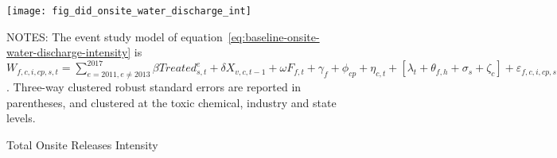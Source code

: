 \begin{figure}[H]
    \centering
    \texttt{[image: fig\_did\_onsite\_water\_discharge\_int]}
    \caption{Total Onsite Releases Intensity}
    \label{fig:baseline-onsite-water-discharge-intensity}
    \begin{minipage}{12cm}
        \vspace{0.05in}
        NOTES: The event study model of equation~\ref{eq:baseline-onsite-water-discharge-intensity} is $W_{f,c,i,cp,s,t} = \sum_{{e = 2011},{e \neq 2013}}^{2017} \beta Treated_{s,t}^e + \delta X_{v,c,t-1} + \omega F_{f,t} + \gamma_{f} + \phi_{cp} + \eta_{c,t} + \left[\lambda_{t} + \theta_{f,h} + \sigma_{s} + \zeta_{c} \right] + \varepsilon_{f,c,i,cp,s,t}$. Three-way clustered robust standard errors are reported in parentheses, and clustered at the toxic chemical, industry and state levels.
    \end{minipage}
\end{figure}